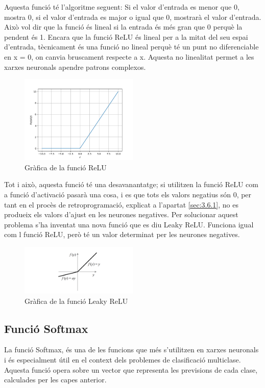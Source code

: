 Aquesta funció té l'algoritme seguent: Si el valor d'entrada es menor que 0, mostra 0, si el valor d'entrada es major o igual que 0, mostrarà el valor d'entrada. Això vol dir que la funció és lineal si la entrada és més gran que 0 perquè la pendent és 1. Encara que la funció ReLU és lineal per a la mitat del seu espai d'entrada, tècnicament és una funció no lineal perquè té un punt no diferenciable en x = 0, on canvia bruscament respecte a x. Aquesta no linealitat permet a les xarxes neuronals apendre patrons complexos.

\begin{figure}[h!]
    \centering
    \includegraphics[width=0.5\textwidth]{./figures/ReLU.png}
    \caption{Gràfica de la funció ReLU}
\end{figure}

Tot i això, aquesta funció té una desavanantatge; si utilitzen la funció ReLU com a funció d'activació pasarà una cosa, i es que tots els valors negatius són 0, per tant en el procès de retroprogramació, explicat a l'apartat \ref{sec:3.6.1}, no es produeix els valors d'ajust en les neurones negatives. Per solucionar aquest problema s'ha inventat una nova funció que es diu Leaky ReLU. Funciona igual com l funció ReLU, però té un valor determinat per les neurones negatives.

\begin{figure}[h!]
    \centering
    \includegraphics[width=0.5\textwidth]{./figures/leaky_ReLU.png}
    \caption{Gràfica de la funció Leaky ReLU}
\end{figure}

\subsection{Funció Softmax}
La funció Softmax, és una de les funcions que més s'utilitzen en xarxes neuronals i és especialment útil en el context dels problemes de clasificació multiclase. Aquesta funció opera sobre un vector que representa les previsions de cada clase, calculades per les capes anterior.

